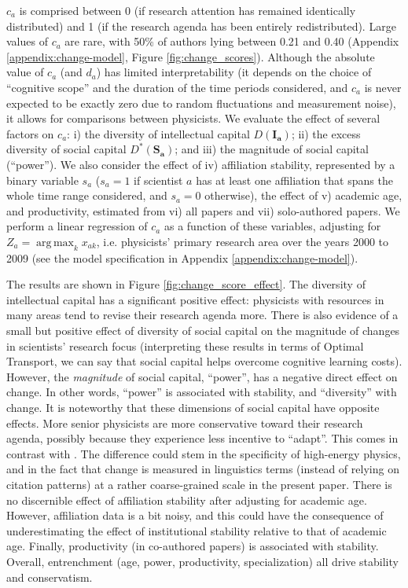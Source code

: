 \documentclass{article}
\DeclareMathOperator*{\argmax}{arg\,max}
\begin{document}
$c_a$ is comprised between 0 (if research attention has remained identically distributed) and 1 (if the research agenda has been entirely redistributed).
Large values of $c_a$ are rare, with 50\% of authors lying between 0.21 and 0.40  (Appendix \ref{appendix:change-model}, Figure \ref{fig:change_scores}). Although the absolute value of $c_a$ (and $d_a$) has limited interpretability (it depends on the choice of ``cognitive scope''   and the duration of the time periods considered, and $c_a$ is never expected to be exactly zero due to random fluctuations and measurement noise), it allows for comparisons between physicists. We evaluate the effect of several factors on $c_a$: i) the diversity of intellectual capital $D(\bm{I_a})$; ii) the excess diversity of social capital $D^{\ast}(\bm{S_a})$; and iii) the magnitude of social capital (``power''). We also consider the effect of iv) affiliation stability, represented by a binary variable $s_a$ ($s_a=1$ if scientist $a$ has at least one affiliation that spans the whole time range considered, and $s_a=0$ otherwise), the effect of v) academic age, and productivity, estimated from vi) all papers and vii) solo-authored papers. We perform a linear regression of $c_a$ as a function of these variables, adjusting for $Z_a=\argmax_{k} x_{ak}$, i.e. physicists' primary research area over the years 2000 to 2009 (see the model specification in Appendix \ref{appendix:change-model}).

The results are shown in Figure \ref{fig:change_score_effect}. The diversity of intellectual capital has a significant positive effect: physicists with resources in many areas tend to revise their research agenda more. There is also evidence of a small but positive effect of diversity of social capital on the magnitude of changes in scientists' research focus (interpreting these results in terms of Optimal Transport, we can say that social capital helps overcome cognitive learning costs). However, the \textit{magnitude} of social capital, ``power'', has a negative direct effect on change. In other words, ``power'' is associated with stability, and ``diversity'' with change. It is noteworthy that these dimensions of social capital have opposite effects. More senior physicists are more conservative toward their research agenda, possibly because they experience less incentive to ``adapt''. This comes in contrast with \cite{Zeng2019}. The difference could stem in the specificity of high-energy physics, and in the fact that change is measured in linguistics terms (instead of relying on citation patterns) at a rather coarse-grained scale in the present paper. There is no discernible effect of affiliation stability after adjusting for academic age. However, affiliation data is a bit noisy, and this could have the consequence of underestimating the effect of institutional stability relative to that of academic age. Finally, productivity (in co-authored papers) is associated with stability. Overall, entrenchment (age, power, productivity, specialization) all drive stability and conservatism. 
\end{document}
